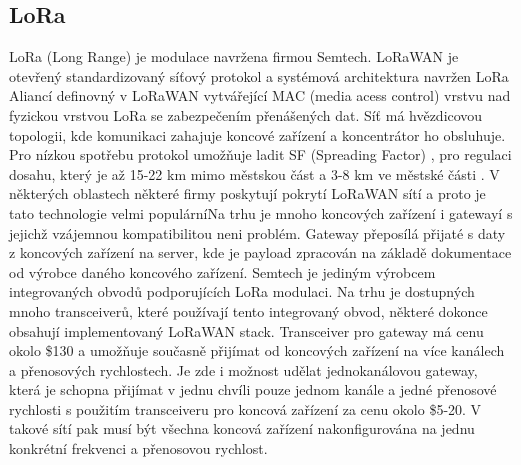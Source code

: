 \subsection{LoRa}
LoRa (Long Range) je modulace navržena firmou Semtech.
LoRaWAN je otevřený standardizovaný síťový protokol a systémová architektura navržen LoRa Aliancí definovný v LoRaWAN \DIFdelbegin {}\DIFdelend \DIFaddbegin {}\DIFaddend \cite{lorawan_specification} vytvářející MAC (media acess control) vrstvu nad fyzickou vrstvou LoRa se zabezpečením přenášených dat. 
Síť má hvězdicovou topologii, kde komunikaci zahajuje koncové zařízení a koncentrátor ho obsluhuje.
Pro nízkou spotřebu protokol umožňuje ladit SF (Spreading Factor) \DIFdelbegin {}\DIFdelend \DIFaddbegin {}\DIFaddend , pro regulaci dosahu, který je až 15-22 km mimo městskou část a 3-8 km ve městské části \cite{lorawan_specification}.
V některých oblastech některé firmy poskytují pokrytí LoRaWAN sítí a proto je tato technologie velmi populární\DIFdelbegin \DIFdel{, }\DIFdelend \DIFaddbegin {}\DIFaddend Na trhu je mnoho koncových zařízení i gatewayí \DIFdelbegin \DIFdel{, }\DIFdelend s jejichž vzájemnou kompatibilitou neni problém. Gateway přeposílá přijaté \DIFdelbegin {}\DIFdelend \DIFaddbegin {}\DIFaddend s daty z koncových zařízení na server, kde je payload zpracován na základě dokumentace od výrobce daného koncového zařízení.
Semtech je jediným výrobcem integrovaných obvodů podporujících LoRa modulaci. Na trhu je dostupných mnoho transceiverů, které používají tento integrovaný obvod, některé dokonce obsahují implementovaný LoRaWAN stack.
Transceiver pro gateway má cenu okolo \$130 a umožňuje současně přijímat \DIFdelbegin {}\DIFdelend \DIFaddbegin {}\DIFaddend od koncových zařízení na více kanálech a přenosových rychlostech. Je zde i možnost udělat jednokanálovou gateway, která je schopna přijímat v jednu chvíli pouze \DIFaddbegin {}\DIFaddend jednom kanále a jedné přenosové rychlosti s použitím transceiveru pro koncová zařízení za cenu okolo \$5-20. V takové sítí pak musí být všechna koncová zařízení nakonfigurována na jednu konkrétní frekvenci a přenosovou rychlost.


